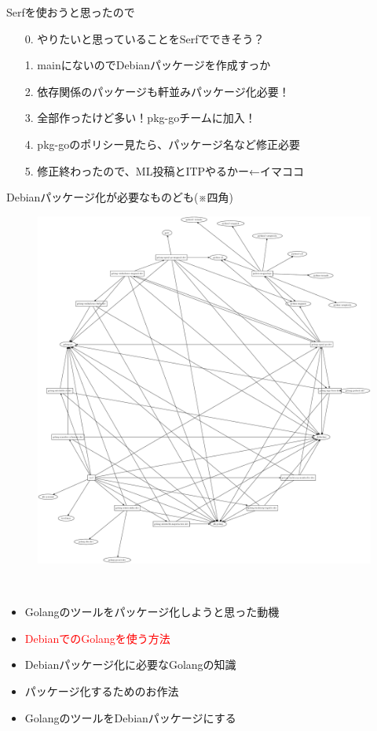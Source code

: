 \begin{frame}{Serfを使おうと思ったので}
  \begin{itemize}
  \item[0.] やりたいと思っていることをSerfでできそう？
  \item[1.] mainにないのでDebianパッケージを作成すっか
  \item[2.] 依存関係のパッケージも軒並みパッケージ化必要！
  \item[3.] 全部作ったけど多い！pkg-goチームに加入！
  \item[4.] pkg-goのポリシー見たら、パッケージ名など修正必要
  \item[5.] 修正終わったので、ML投稿とITPやるかー←イマココ
  \end{itemize}
\end{frame}

\begin{frame}{Debianパッケージ化が必要なものども(※四角)}
\begin{figure}[H]
\begin{center}
  \includegraphics[width=0.7\hsize]{image201404/serf-dependency.eps}
 \label{fig:serf-dependencies}
\end{center}
\end{figure}
\end{frame}

\begin{frame}{　}
\begin{itemize}
  \item Golangのツールをパッケージ化しようと思った動機
  \item \textcolor{red}{DebianでのGolangを使う方法}
  \item Debianパッケージ化に必要なGolangの知識
  \item パッケージ化するためのお作法
  \item GolangのツールをDebianパッケージにする
\end{itemize}
\end{frame}

